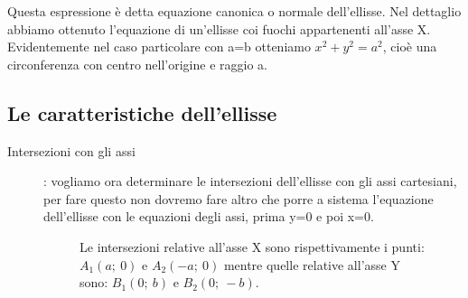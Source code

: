 Questa espressione è detta equazione canonica o normale dell'ellisse.
Nel dettaglio abbiamo ottenuto l'equazione di un'ellisse coi fuochi 
appartenenti all'asse X.
Evidentemente nel caso particolare con a=b otteniamo $ x^{2}+y^{2}=a^{2}$, 
cioè una circonferenza con centro nell'origine e raggio a.

\subsection{Le caratteristiche dell'ellisse}

\begin{description}
\item [Intersezioni con gli assi]: vogliamo ora determinare le 
intersezioni dell'ellisse con gli assi cartesiani, per fare questo non 
dovremo fare altro che porre a sistema l'equazione dell'ellisse con le 
equazioni degli assi, prima y=0 e poi x=0.
\begin{figure}[h]
\hspace{8mm}
\begin{minipage}{.4\textwidth}
Le intersezioni relative all'asse X sono rispettivamente i punti:
$A_{1}(a;~0)$ e $A_{2}(-a;~0)$ mentre quelle relative all'asse Y sono:
$B_{1}(0;~b)$ e $B_{2}(0;~-b)$.


\end{minipage}
\end{figure}
\end{description}
